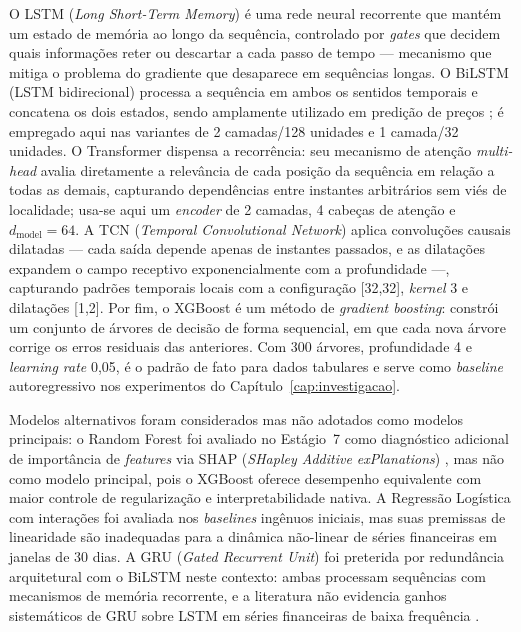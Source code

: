 O LSTM (\textit{Long Short-Term Memory}) \cite{hochreiter1997} é uma rede neural recorrente que mantém um estado de memória ao longo da sequência, controlado por \textit{gates} que decidem quais informações reter ou descartar a cada passo de tempo --- mecanismo que mitiga o problema do gradiente que desaparece em sequências longas. O BiLSTM (LSTM bidirecional) processa a sequência em ambos os sentidos temporais e concatena os dois estados, sendo amplamente utilizado em predição de preços \cite{fischer2018}; é empregado aqui nas variantes de 2 camadas/128 unidades e 1 camada/32 unidades. O Transformer \cite{vaswani2017} dispensa a recorrência: seu mecanismo de atenção \textit{multi-head} avalia diretamente a relevância de cada posição da sequência em relação a todas as demais, capturando dependências entre instantes arbitrários sem viés de localidade; usa-se aqui um \textit{encoder} de 2 camadas, 4 cabeças de atenção e $d_\text{model}=64$. A TCN (\textit{Temporal Convolutional Network}) \cite{bai2018} aplica convoluções causais dilatadas --- cada saída depende apenas de instantes passados, e as dilatações expandem o campo receptivo exponencialmente com a profundidade ---, capturando padrões temporais locais com a configuração [32,32], \textit{kernel} 3 e dilatações [1,2]. Por fim, o XGBoost \cite{chen2016} é um método de \textit{gradient boosting}: constrói um conjunto de árvores de decisão de forma sequencial, em que cada nova árvore corrige os erros residuais das anteriores. Com 300 árvores, profundidade 4 e \textit{learning rate} 0,05, é o padrão de fato para dados tabulares e serve como \textit{baseline} autoregressivo nos experimentos do Capítulo~\ref{cap:investigacao}.

Modelos alternativos foram considerados mas não adotados como modelos principais: o Random Forest foi avaliado no Estágio~7 como diagnóstico adicional de importância de \textit{features} via SHAP (\textit{SHapley Additive exPlanations}) \cite{lundberg2017}, mas não como modelo principal, pois o XGBoost oferece desempenho equivalente com maior controle de regularização e interpretabilidade nativa. A Regressão Logística com interações foi avaliada nos \textit{baselines} ingênuos iniciais, mas suas premissas de linearidade são inadequadas para a dinâmica não-linear de séries financeiras em janelas de 30 dias. A GRU (\textit{Gated Recurrent Unit}) foi preterida por redundância arquitetural com o BiLSTM neste contexto: ambas processam sequências com mecanismos de memória recorrente, e a literatura não evidencia ganhos sistemáticos de GRU sobre LSTM em séries financeiras de baixa frequência \cite{fischer2018}.

